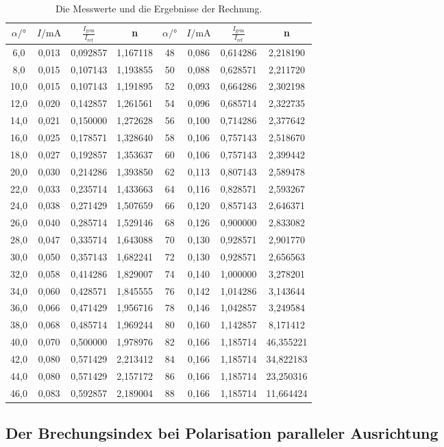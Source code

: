 \begin{table}
  \centering
  \caption{Die Messwerte und die Ergebnisse der Rechnung.}
  \label{tab:mess1}
  \begin{tabular}{c c c c c c c c}
    \toprule
    $\alpha / °$ &     $I / \unit{\milli\ampere}$ & $\frac{I_\text{gem}}{I_\text{ref}}$ & n &$\alpha / °$ &    $I / \unit{\milli\ampere}$ & $\frac{I_\text{gem}}{I_\text{ref}}$& n \\
    \midrule
       6,0 & 0,013 &  0,092857 & 1,167118 &48 & 0,086 & 0,614286 &  2,218190 \\
       8,0 & 0,015 &  0,107143 & 1,193855 &50 & 0,088 & 0,628571 &  2,211720 \\
      10,0 & 0,015 &  0,107143 & 1,191895 &52 & 0,093 & 0,664286 &  2,302198 \\
      12,0 & 0,020 &  0,142857 & 1,261561 &54 & 0,096 & 0,685714 &  2,322735 \\
      14,0 & 0,021 &  0,150000 & 1,272628 &56 & 0,100 & 0,714286 &  2,377642 \\
      16,0 & 0,025 &  0,178571 & 1,328640 &58 & 0,106 & 0,757143 &  2,518670 \\
      18,0 & 0,027 &  0,192857 & 1,353637 &60 & 0,106 & 0,757143 &  2,399442 \\
      20,0 & 0,030 &  0,214286 & 1,393850 &62 & 0,113 & 0,807143 &  2,589478 \\
      22,0 & 0,033 &  0,235714 & 1,433663 &64 & 0,116 & 0,828571 &  2,593267 \\
      24,0 & 0,038 &  0,271429 & 1,507659 &66 & 0,120 & 0,857143 &  2,646371 \\
      26,0 & 0,040 &  0,285714 & 1,529146 &68 & 0,126 & 0,900000 &  2,833082 \\
      28,0 & 0,047 &  0,335714 & 1,643088 &70 & 0,130 & 0,928571 &  2,901770 \\
      30,0 & 0,050 &  0,357143 & 1,682241 &72 & 0,130 & 0,928571 &  2,656563 \\
      32,0 & 0,058 &  0,414286 & 1,829007 &74 & 0,140 & 1,000000 &  3,278201 \\
      34,0 & 0,060 &  0,428571 & 1,845555 &76 & 0,142 & 1,014286 &  3,143644 \\
      36,0 & 0,066 &  0,471429 & 1,956716 &78 & 0,146 & 1,042857 &  3,249584 \\
      38,0 & 0,068 &  0,485714 & 1,969244 &80 & 0,160 & 1,142857 &  8,171412 \\
      40,0 & 0,070 &  0,500000 & 1,978976 &82 & 0,166 & 1,185714 & 46,355221 \\
      42,0 & 0,080 &  0,571429 & 2,213412 &84 & 0,166 & 1,185714 & 34,822183 \\
      44,0 & 0,080 &  0,571429 & 2,157172 &86 & 0,166 & 1,185714 & 23,250316 \\
      46,0 & 0,083 &  0,592857 & 2,189004 &88 & 0,166 & 1,185714 & 11,664424 \\
    \bottomrule
    \end{tabular}
\end{table}

\subsection{Der Brechungsindex bei Polarisation paralleler Ausrichtung}

